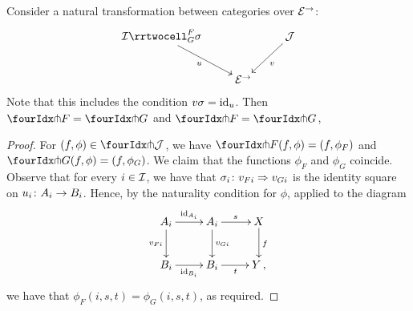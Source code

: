 \documentclass[reqno,10pt,a4paper,oneside]{amsart}
\begin{document}
\begin{proposition} \label{thm:orth-nat}
Consider a natural transformation between categories over $\catE^{\to}$:
\[
\xymatrix{
  \cal{I}
  \rrtwocell_G^F{\sigma}
 \ar[dr]_{u}
&&
  \cal{J}
  \ar[dl]^{v}
\\&
  \catE^{\to}
}
\]
Note that this includes the condition $v \sigma = \id_u$.
Then $\liftr{F} = \liftr{G}$ and $\liftl{F} = \liftl{G}$, 
\end{proposition}

\begin{proof} For $(f, \phi) \in \liftr{\cal{J}}$, we have $\liftr{F}(f, \phi) = (f, \phi_F)$ and $\liftr{G}(f, \phi) = (f, \phi_G)$.
We claim that the functions $\phi_F$ and $\phi_G$ coincide. Observe that 
for every $i \in \cal{I}$, we have that $\sigma_i \co v_{Fi}  \Rightarrow v_{Gi}$ is the identity square on $u_i
\co A_i \to B_i$. Hence, by the naturality condition for $\phi$, applied to the diagram 
\[
\xymatrix{
A_i \ar[r]^{\id_{A_i}} \ar[d]_{v_{Fi}}  & A_i \ar[d]^{v_{Gi}} \ar[r]^{s}  & X \ar[d]^{f} \\
B_i \ar[r]_{\id_{B_i}} & B_i \ar[r]_{t} & Y \, ,}
\]
we have  that $\phi_F(i, s, t) = \phi_G(i, s, t)$, as required.
\end{proof} 
\end{document}
